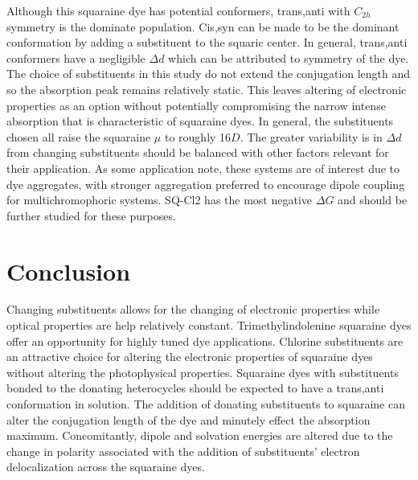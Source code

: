 \documentclass[journal=jacsat,manuscript=article]{achemso}
\begin{document}
Although this squaraine dye has potential conformers, trans,anti with $C_{2h}$ symmetry is the dominate population. Cis,syn can be made to be the dominant conformation by adding a substituent to the squaric center. In general, trans,anti conformers have a negligible $\Delta d$ which can be attributed to symmetry of the dye.
The choice of substituents in this study do not extend the conjugation length and so the absorption peak remains relatively static. This leaves altering of electronic properties as an option without potentially compromising the narrow intense absorption that is characteristic of squaraine dyes.
In general, the substituents chosen all raise the squaraine $\mu$ to roughly 16$D$. The greater variability is in $\Delta d$ from changing substituents should be balanced with other factors relevant for their application. 
As some application note, these systems are of interest due to dye aggregates, with stronger aggregation preferred to encourage dipole coupling for multichromophoric systems. SQ-Cl2 has the most negative $\Delta G$ and should be further studied for these purposes.

\section{Conclusion}
Changing substituents allows for the changing of electronic properties while optical properties are help relatively constant. Trimethylindolenine squaraine dyes offer an opportunity for highly tuned dye applications. Chlorine substituents are an attractive choice for altering the electronic properties of squaraine dyes without altering the photophysical properties. Squaraine dyes with substituents bonded to the donating heterocycles should be expected to have a trans,anti conformation in solution. The addition of donating substituents to squaraine can alter the conjugation length of the dye and minutely effect the absorption maximum. Concomitantly, dipole and solvation energies are altered due to the change in polarity associated with the addition of substituents' electron delocalization across the squaraine dyes. 

\newpage
 

\end{document}
